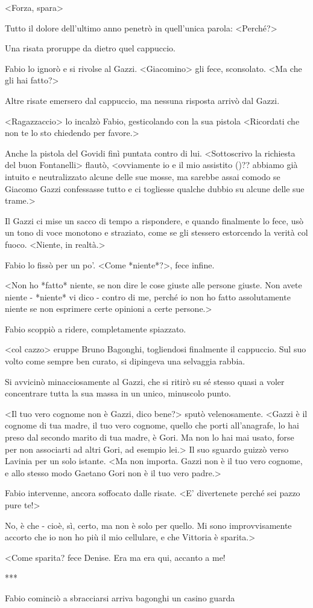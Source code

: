 <Forza, spara>

Tutto il dolore dell'ultimo anno penetrò in quell'unica parola: <Perché?>

Una risata proruppe da dietro quel cappuccio.

Fabio lo ignorò e si rivolse al Gazzi. <Giacomino> gli fece, sconsolato. <Ma che gli hai fatto?>

Altre risate emersero dal cappuccio, ma nessuna risposta arrivò dal Gazzi.

<Ragazzaccio> lo incalzò Fabio, gesticolando con la sua pistola <Ricordati che non te lo sto chiedendo per favore.>

Anche la pistola del Govidi finì puntata contro di lui. <Sottoscrivo la richiesta del buon Fontanelli> flautò, <ovviamente io e il mio assistito ()?? abbiamo già intuito e neutralizzato alcune delle sue mosse, ma sarebbe assai comodo se Giacomo Gazzi confessasse tutto e ci togliesse qualche dubbio su alcune delle sue trame.>

Il Gazzi ci mise un sacco di tempo a rispondere, e quando finalmente lo fece, usò un tono di voce monotono e straziato, come se gli stessero estorcendo la verità col fuoco. <Niente, in realtà.>

Fabio lo fissò per un po'. <Come *niente*?>, fece infine.

<Non ho *fatto* niente, se non dire le cose giuste alle persone giuste. Non avete niente - *niente* vi dico - contro di me, perché io non ho fatto assolutamente niente se non esprimere certe opinioni a certe persone.>

Fabio scoppiò a ridere, completamente spiazzato.

<col cazzo> eruppe Bruno Bagonghi, togliendosi finalmente il cappuccio. Sul suo volto come sempre ben curato, si dipingeva una selvaggia rabbia.

Si avvicinò minacciosamente al Gazzi, che si ritirò su sé stesso quasi a voler concentrare tutta la sua massa in un unico, minuscolo punto.

<Il tuo vero cognome non è Gazzi, dico bene?> sputò velenosamente. <Gazzi è il cognome di tua madre, il tuo vero cognome, quello che porti all'anagrafe, lo hai preso dal secondo marito di tua madre, è Gori. Ma non lo hai mai usato, forse per non associarti ad altri Gori, ad esempio lei.> Il suo sguardo guizzò verso Lavinia per un solo istante. <Ma non importa. Gazzi non è il tuo vero cognome, e allo stesso modo Gaetano Gori non è il tuo vero padre.>

Fabio intervenne, ancora soffocato dalle risate. <E' divertenete perché sei pazzo pure te!>

No, è che - cioè, sì, certo, ma non è solo per quello. Mi sono improvvisamente accorto che io non ho più il mio cellulare, e che Vittoria è sparita.>

<Come sparita? fece Denise. Era ma era qui, accanto a me!



***

Fabio cominciò a sbracciarsi
arriva bagonghi un casino guarda
